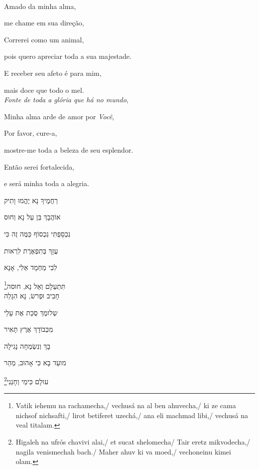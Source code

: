 \movetooddpage
\raggedright

\vspace*{1cm}

\textbf{}\\[15pt]

Amado da minha alma,

me chame em sua direção,

Correrei como um animal,

pois quero apreciar toda a sua majestade.

E receber seu afeto é para mim,

mais doce que todo o mel.\\[10pt]

\emph{Fonte de toda a glória que há no mundo},

Minha alma arde de amor por \emph{Você},

Por favor, cure-a,

mostre-me toda a beleza de seu esplendor.

Então serei fortalecida,

e será minha toda a alegria.\\[10pt]

\movetoevenpage
\raggedleft

\vspace*{1cm}

רַחֲמֶיךָ נָא יֶהֱמוּ וָתִיק 

אוֹהֲבָךְ בֵּן עַל נָא וְחוּס 

נִכְסַפְתִּי נִכְסוֹף כַּמֶּה זֶה כִּי 

עֻזָךְ בְּתִפְאֶרֶת לִרְאות 

לִבִי מַחְמָד אֵלִי, אָנָא 

תִּתְעַלָם וְאַל נָא, חוּסה\footnote{Vatik iehemu na rachamecha,/
vechusá na al ben ahuvecha,/ ki ze cama nichsof nichsafti,/ lirot betiferet uzechá,/
ana eli machmad libi,/ vechusá na veal titalam.}\\[10pt]

חָבִיב וּפְרשׂ, נָא הִגָלֵה

שְלומֶךְ סֻכַת אֶת עָלַי 

מִכְּבוֹדָךְ אֶרֶץ תָּאִיר 

בָךְ וְנִשְׂמְחָה נָגִילָה 

מועֵד בָא כִּי אָהוּב, מַהֵר

עולָם כִּימֵי וְחָנֵנִי\footnote{
Higaleh na ufrós chavivi alai,/
et sucat shelomecha/ Tair eretz mikvodecha,/ nagila venismechah bach./ Maher ahuv ki va moed,/
vechoneinu kimei olam.}

